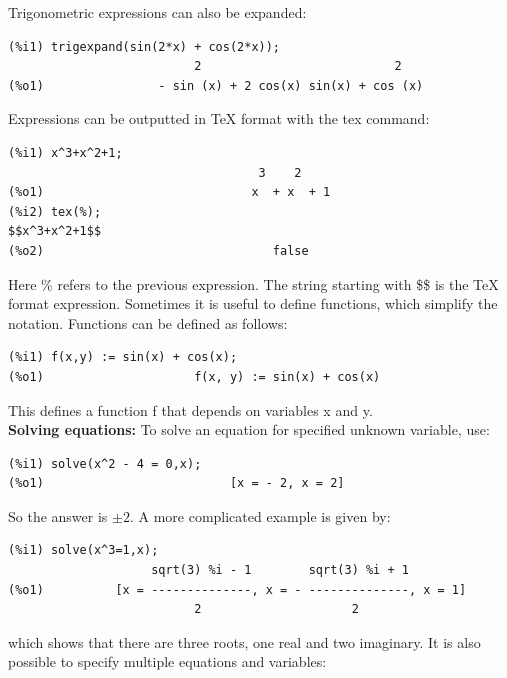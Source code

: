 \documentclass[byrevtex,amssymb,aps,pra,floatfix,letterpaper]{revtex4}
\begin{document}
\noindent
Trigonometric expressions can also be expanded:

\begin{verbatim}
(%i1) trigexpand(sin(2*x) + cos(2*x));
                          2                           2
(%o1)                - sin (x) + 2 cos(x) sin(x) + cos (x)
\end{verbatim}

\noindent
Expressions can be outputted in \TeX{} format with the tex command:\\

\begin{verbatim}
(%i1) x^3+x^2+1;
                                   3    2
(%o1)                             x  + x  + 1
(%i2) tex(%);
$$x^3+x^2+1$$
(%o2)                                false
\end{verbatim}

\noindent
Here \% refers to the previous expression. The string starting with \$\$ is the \TeX{} format expression. Sometimes it is useful to define functions, which simplify the notation. Functions can be defined as follows:\\

\begin{verbatim}
(%i1) f(x,y) := sin(x) + cos(x);
(%o1)                     f(x, y) := sin(x) + cos(x)
\end{verbatim}

\noindent
This defines a function f that depends on variables x and y.\\

\noindent
\textbf{Solving equations:} To solve an equation for specified unknown variable, use:

\begin{verbatim}
(%i1) solve(x^2 - 4 = 0,x);
(%o1)                          [x = - 2, x = 2]
\end{verbatim}

\noindent
So the answer is $\pm 2$. A more complicated example is given by:

\begin{verbatim}
(%i1) solve(x^3=1,x);
                    sqrt(3) %i - 1        sqrt(3) %i + 1
(%o1)          [x = --------------, x = - --------------, x = 1]
                          2                     2
\end{verbatim}

\noindent
which shows that there are three roots, one real and two imaginary. It is also possible to specify multiple equations and variables:
\end{document}
